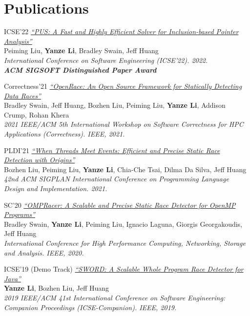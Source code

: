 \documentclass[12pt,letterpaper]{report}
\newcommand{\listtabwidth}{1.75cm}
\begin{document}
\section*{Publications}
\renewcommand{\listtabwidth}{3cm}
\begin{tablist}
	\item[ICSE'22] \tab \href{https://liyz.pl/index/icse22-pus.pdf}{\textit{\enquote{PUS: A Fast and Highly Efficient Solver for Inclusion-based Pointer Analysis}}}\\
	Peiming Liu, \textbf{Yanze Li}, Bradley Swain, Jeff Huang \\
	\textit{International Conference on Software Engineering (ICSE'22). 2022.} \\
	\textit{\textbf{ACM SIGSOFT Distinguished Paper Award}}
	\item[Correctness'21] \tab \href{https://liyz.pl/index/correctness21-openrace.pdf}{\textit{\enquote{OpenRace: An Open Source Framework for Statically Detecting Data Races}}}\\
	Bradley Swain, Jeff Huang, Bozhen Liu, Peiming Liu, \textbf{Yanze Li}, Addison Crump, Rohan Khera \\
	\textit{2021 IEEE/ACM 5th International Workshop on Software Correctness for HPC Applications (Correctness). IEEE, 2021.}
	\item[PLDI'21] \tab \href{https://liyz.pl/index/pldi21-origin.pdf}{\textit{\enquote{When Threads Meet Events: Efficient and Precise Static Race Detection with Origins}}}\\
	Bozhen Liu, Peiming Liu, \textbf{Yanze Li}, Chia-Che Tsai, Dilma Da Silva, Jeff Huang \\
	\textit{42nd ACM SIGPLAN International Conference on Programming Language Design and Implementation. 2021.}
	\item[SC'20] \tab \href{https://liyz.pl/index/sc20-ompracer.pdf}{\textit{\enquote{OMPRacer: A Scalable and Precise Static Race Detector for OpenMP Programs}}}\\
	Bradley Swain, \textbf{Yanze Li}, Peiming Liu, Ignacio Laguna, Giorgis Georgakoudis, Jeff Huang\\
	\textit{International Conference for High Performance Computing, Networking, Storage and Analysis. IEEE, 2020.}
	\item[ICSE'19] \tab (Demo Track) \href{https://liyz.pl/index/icse2019-demo.pdf}{\textit{\enquote{SWORD: A Scalable Whole Program Race Detector for Java}}}\\
	\textbf{Yanze Li}, Bozhen Liu, Jeff Huang\\
	\textit{2019 IEEE/ACM 41st International Conference on Software Engineering: Companion Proceedings (ICSE-Companion). IEEE, 2019.}
\end{tablist}
\renewcommand{\listtabwidth}{1.75cm}
\end{document}

